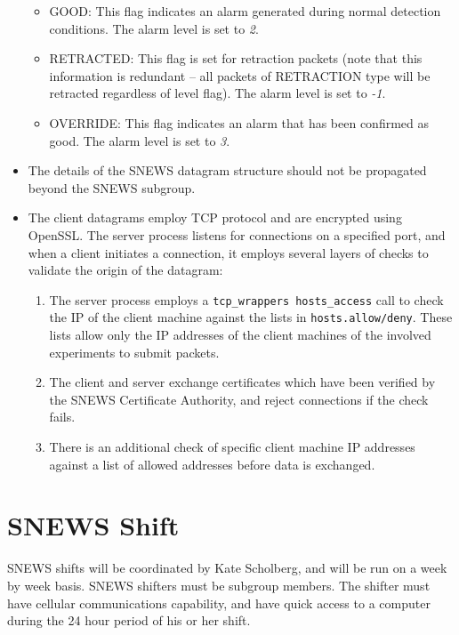\documentclass{article}
\begin{document}
\begin{itemize}
\begin{itemize}
\item GOOD: This flag indicates an alarm generated during
normal detection conditions.  The alarm level is set to {\it 2}.

\item RETRACTED: This flag is set for retraction 
packets (note that this information is redundant -- all packets of
RETRACTION type will be retracted regardless of level flag).  The
alarm level is set to {\it -1}.

\item OVERRIDE: This flag indicates an alarm 
that has been confirmed as good.  The alarm level is set to {\it 3}.

\end{itemize}
 
\item The details of the SNEWS datagram structure should
not be propagated beyond the SNEWS subgroup.

\item The client datagrams employ TCP protocol and 
are encrypted using OpenSSL.  
The server process listens for connections on a specified port,
and when a client initiates a connection, it employs several layers
of checks to validate the origin of the datagram:
\begin{enumerate}
\item The server process employs a {\tt tcp\_wrappers hosts\_access}
call to check the IP of the client machine against the lists in
{\tt hosts.allow/deny}.  These lists allow only the IP addresses
of the client machines of the involved experiments to submit packets.
\item
The client and server exchange certificates which have been
verified by the SNEWS Certificate Authority, and reject
connections if the check fails.
\item There is an additional check of specific client machine
IP addresses against a list of allowed addresses before data is exchanged.
\end{enumerate}
\end{itemize}

\section{SNEWS Shift}

SNEWS shifts will be coordinated by Kate Scholberg, and will be run on
a week by week basis.    SNEWS shifters must be subgroup members.
The shifter must have cellular communications capability, and
have quick access to a computer during the 24 hour period of
his or her shift.
\end{document}
